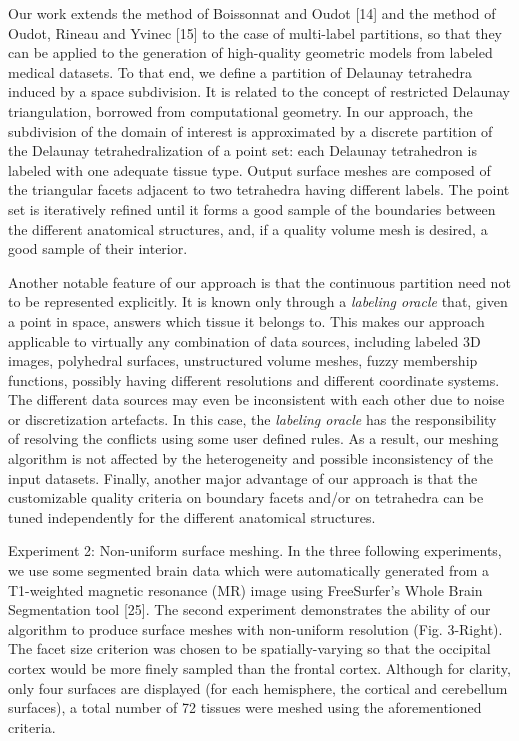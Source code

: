 {Our work extends the method of Boissonnat and Oudot [14] and the method of Oudot, Rineau and Yvinec [15] to the case of multi-label partitions, so that they can be applied to the generation of high-quality geometric models from labeled medical datasets. To that end, we define a partition of Delaunay tetrahedra induced by a space subdivision. It is related to the concept of restricted Delaunay triangulation, borrowed from computational geometry. In our approach, the subdivision of the domain of interest is approximated by a discrete partition of the Delaunay tetrahedralization of a point set: each Delaunay tetrahedron is labeled with one adequate tissue type. Output surface meshes are composed of the triangular facets adjacent to two tetrahedra having different labels. The point set is iteratively refined until it forms a good sample of the boundaries between the different anatomical structures, and, if a quality volume mesh is desired, a good sample of their interior.

Another notable feature of our approach is that the continuous partition need not to be represented explicitly. It is known only through a {\it labeling oracle} that, given a point in space, answers which tissue it belongs to. This makes our approach applicable to virtually any combination of data sources, including labeled 3D images, polyhedral surfaces, unstructured volume meshes, fuzzy membership functions, possibly having different resolutions and different coordinate systems. The different data sources may even be inconsistent with each other due to noise or discretization artefacts. In this case, the {\it labeling oracle} has the responsibility of resolving the conflicts using some user defined rules. As a result, our meshing algorithm is not affected by the heterogeneity and possible inconsistency of the input datasets. Finally, another major advantage of our approach is that the customizable quality criteria on boundary facets and/or on tetrahedra can be tuned independently for the different anatomical structures.


Experiment 2: Non-uniform surface meshing. In the three following experiments, we use some segmented brain data which were automatically generated from a T1-weighted magnetic resonance (MR) image using FreeSurfer's Whole Brain Segmentation tool [25]. The second experiment demonstrates the ability of our algorithm to produce surface meshes with non-uniform resolution (Fig. 3-Right). The facet size criterion was chosen to be spatially-varying so that the occipital cortex would be more finely sampled than the frontal cortex. Although for clarity, only four surfaces are displayed (for each hemisphere, the cortical and cerebellum surfaces), a total number of 72 tissues were meshed using the aforementioned criteria.

}

